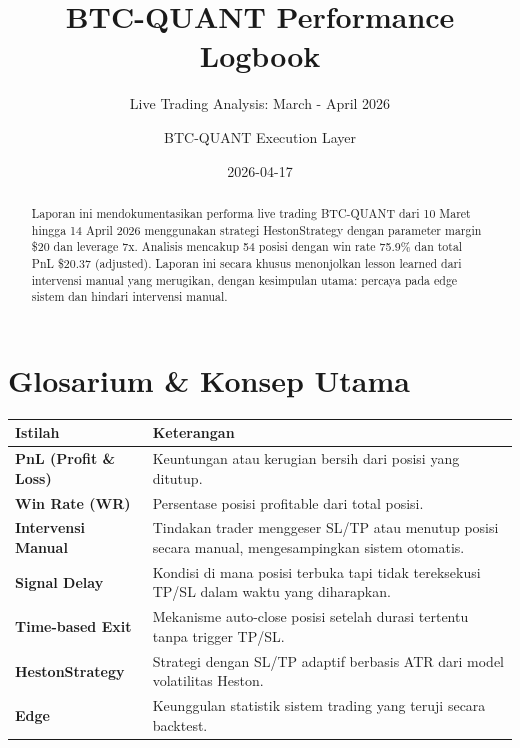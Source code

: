 \documentclass[
  11pt,
  a4paper,
]{article}
\title{BTC-QUANT Performance Logbook}
\subtitle{Live Trading Analysis: March - April 2026}
\author{BTC-QUANT Execution Layer}
\date{2026-04-17}
\newcounter{none} %
\renewcommand*\contentsname{Table of contents}
\newcommand\contentsname{Table of contents}
\begin{document}
\maketitle
\begin{abstract}
Laporan ini mendokumentasikan performa live trading BTC-QUANT dari 10
Maret hingga 14 April 2026 menggunakan strategi HestonStrategy dengan
parameter margin \$20 dan leverage 7x. Analisis mencakup 54 posisi
dengan win rate 75.9\% dan total PnL \$20.37 (adjusted). Laporan ini
secara khusus menonjolkan lesson learned dari intervensi manual yang
merugikan, dengan kesimpulan utama: percaya pada edge sistem dan hindari
intervensi manual.
\end{abstract}

\renewcommand*\contentsname{Table of contents}
{
\setcounter{tocdepth}{2}
\tableofcontents
}

\section{Glosarium \& Konsep Utama}\label{glosarium-konsep-utama}

{\def\LTcaptype{none} %
\begin{longtable}[]{@{}
  >{\raggedright\arraybackslash}p{}
  >{\raggedright\arraybackslash}p{}@{}}
\toprule\noalign{}
\begin{minipage}[b]{\linewidth}\raggedright
Istilah
\end{minipage} & \begin{minipage}[b]{\linewidth}\raggedright
Keterangan
\end{minipage} \\
\midrule\noalign{}
\endhead
\bottomrule\noalign{}
\endlastfoot
\textbf{PnL (Profit \& Loss)} & Keuntungan atau kerugian bersih dari
posisi yang ditutup. \\
\textbf{Win Rate (WR)} & Persentase posisi profitable dari total
posisi. \\
\textbf{Intervensi Manual} & Tindakan trader menggeser SL/TP atau
menutup posisi secara manual, mengesampingkan sistem otomatis. \\
\textbf{Signal Delay} & Kondisi di mana posisi terbuka tapi tidak
tereksekusi TP/SL dalam waktu yang diharapkan. \\
\textbf{Time-based Exit} & Mekanisme auto-close posisi setelah durasi
tertentu tanpa trigger TP/SL. \\
\textbf{HestonStrategy} & Strategi dengan SL/TP adaptif berbasis ATR
dari model volatilitas Heston. \\
\textbf{Edge} & Keunggulan statistik sistem trading yang teruji secara
backtest. \\
\end{longtable}
}
\end{document}
